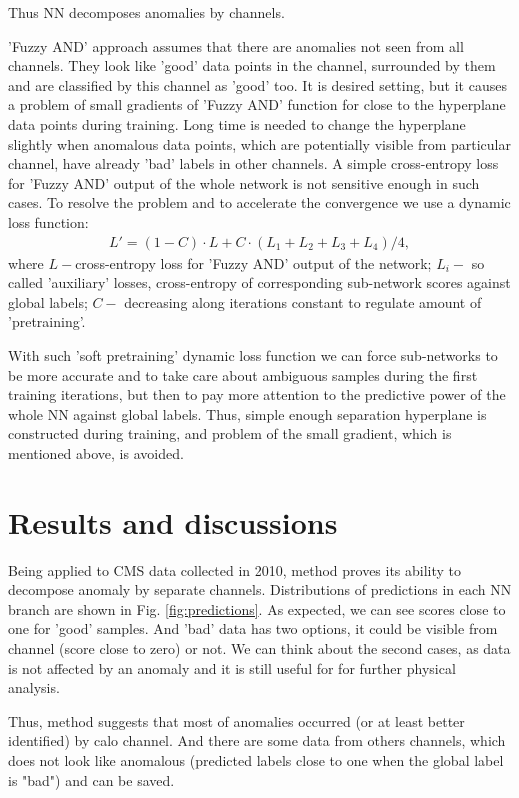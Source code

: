 \documentclass[a4paper]{jpconf}
\begin{document}
Thus NN decomposes anomalies by channels.


'Fuzzy AND' approach assumes that there are anomalies not seen from all channels. They look like 'good' data points in the channel, surrounded by them and are classified by this channel as 'good' too. It is desired setting, but it causes a problem of small gradients of 'Fuzzy AND' function for close to the hyperplane data points during training. Long time is needed to change the hyperplane slightly when anomalous data points, which are potentially visible from particular channel, have already 'bad' labels in other channels. A simple cross-entropy loss for 'Fuzzy AND' output of the whole network is not sensitive enough in such cases. To resolve the problem and to accelerate the convergence we use a dynamic loss function:
\begin{eqnarray}
L' = (1-C) \cdot L + C \cdot (L_1 + L_2 + L_3 + L_4)/ 4 ,
\end{eqnarray}
where $L - $cross-entropy loss for 'Fuzzy AND' output of the network; $L_i - $ so called 'auxiliary' losses, cross-entropy of corresponding sub-network scores against global labels; $C - $ decreasing along iterations constant to regulate amount of 'pretraining'.

With such 'soft pretraining' dynamic loss function we can force sub-networks to be more accurate and to take care about ambiguous samples during the first training iterations, but then to pay more attention to the predictive power of the whole NN against global labels. Thus, simple enough separation hyperplane is constructed during training, and problem of the small gradient, which is mentioned above, is avoided.

\section{Results and discussions}
Being applied to CMS data collected in 2010, method proves its ability to decompose anomaly by separate channels. Distributions of predictions in each NN branch are shown in Fig. \ref{fig:predictions}. As expected, we can see scores close to one for 'good' samples. And 'bad' data has two options, it could be visible from channel (score close to zero) or not. We can think about the second cases, as data is not affected by an anomaly and it is still useful for for further physical analysis.

Thus, method suggests that most of anomalies occurred (or at least better identified) by calo channel. And there are some data from others channels, which does not look like anomalous (predicted labels close to one when the global label is "bad") and can be saved.
\end{document}

